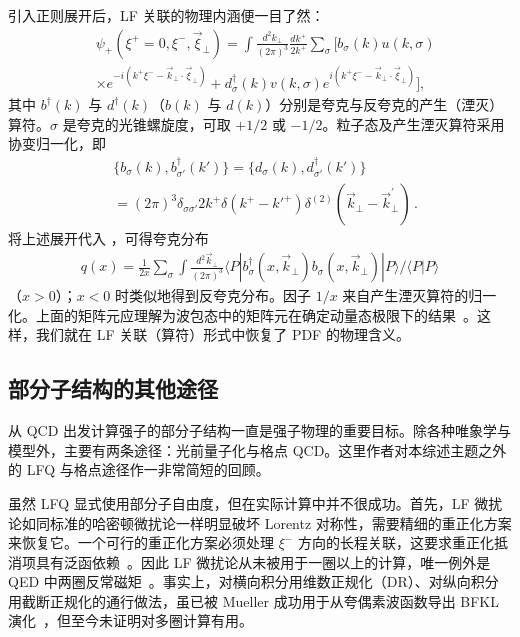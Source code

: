 引入正则展开后，LF 关联的物理内涵便一目了然：
\begin{align}
	& \psi_+(\xi^+=0,\xi^-,\vec{\xi}_\perp)
	= \int \frac{d^2k_\perp}{ (2\pi)^3}
	\frac{dk^+}{ 2k^+}\sum_\sigma \Big[ b_\sigma(k) u({k,\sigma})
	\nonumber \\
	&  \times e^{-i(k^+\xi^--\vec{k}_\perp\cdot\vec{\xi}_\perp)}
	+ d_\sigma^\dagger(k) v({k,\sigma})e^{i(k^+\xi^--\vec{k}_\perp\cdot\vec{\xi}_\perp)}
	\Big],
\end{align}
其中 $b^\dagger(k)$ 与 $d^\dagger(k)$（$b(k)$ 与 $d(k)$）分别是夸克与反夸克的产生（湮灭）算符。{$\sigma$ 是夸克的光锥螺旋度，可取 $+1/2$ 或 $-1/2$。}粒子态及产生湮灭算符采用协变归一化，即
\begin{align}
	& \big\{b_\sigma(k),b_{\sigma'}^\dagger(k')\big\}=
	\big\{d_\sigma(k),d_{\sigma'}^\dagger(k')\big\} \nonumber \\
	& =(2\pi)^3\delta_{\sigma\sigma'}2k^+\delta(k^+-k'^{+})
	\delta^{(2)}(\vec{k}_\perp-\vec{k}_\perp^\prime)\,.
\end{align}
将上述展开代入 ，可得夸克分布
\begin{align}
	q(x) = \frac{1}{2x} \sum_\sigma \int \frac{d^2{\vec k}_\perp}{(2\pi)^3}
	\langle P|b_\sigma^\dagger(x,\vec{k}_\perp)b_\sigma(x,\vec{k}_\perp)|P\rangle/\langle P|P\rangle
	\label{eq:partonfock}
\end{align}
（$x>0$）；$x<0$ 时类似地得到反夸克分布。因子 $1/x$ 来自产生湮灭算符的归一化。上面的矩阵元应理解为波包态中的矩阵元在确定动量态极限下的结果~\cite{Collins:2011zzd}。这样，我们就在 LF 关联（算符）形式中恢复了 PDF 的物理含义。

\subsection{部分子结构的其他途径}
\label{sec:intro_other}

从 QCD 出发计算强子的部分子结构一直是强子物理的重要目标。除各种唯象学与模型外，主要有两条途径：光前量子化与格点 QCD。这里作者对本综述主题之外的 LFQ 与格点途径作一非常简短的回顾。

虽然 LFQ 显式使用部分子自由度，但在实际计算中并不很成功。首先，LF 微扰论如同标准的哈密顿微扰论一样明显破坏 Lorentz 对称性，需要精细的重正化方案来恢复它。一个可行的重正化方案必须处理 $\xi^-$ 方向的长程关联，这要求重正化抵消项具有泛函依赖~\cite{Wilson:1994fk}。因此 LF 微扰论从未被用于一圈以上的计算，唯一例外是 QED 中两圈反常磁矩~\cite{Langnau:1992zj}。事实上，对横向积分用维数正规化（DR）、对纵向积分用截断正规化的通行做法，虽已被 Mueller 成功用于从夸偶素波函数导出 BFKL 演化~\cite{Mueller:1993rr}，但至今未证明对多圈计算有用。

